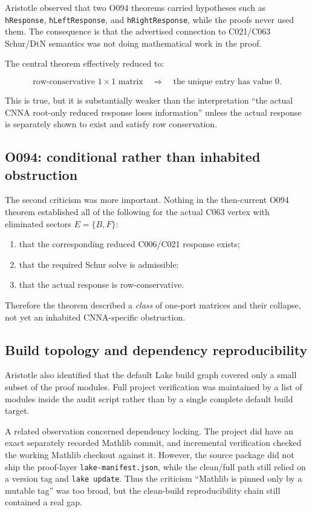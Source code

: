 \documentclass[11pt,a4paper]{article}
\begin{document}
Aristotle observed that two O094 theorems carried hypotheses such as
\texttt{hResponse}, \texttt{hLeftResponse}, and \texttt{hRightResponse}, while the proofs never used them. The consequence is that the advertised connection to C021/C063 Schur/DtN semantics was not doing mathematical work in the proof.

The central theorem effectively reduced to:

\[
\text{row-conservative } 1\times 1 \text{ matrix}
\quad\Longrightarrow\quad
\text{the unique entry has value } 0.
\]

This is true, but it is substantially weaker than the interpretation ``the actual CNNA root-only reduced response loses information'' unless the actual response is separately shown to exist and satisfy row conservation.

\subsection{O094: conditional rather than inhabited obstruction}

The second criticism was more important. Nothing in the then-current O094 theorem established all of the following for the actual C063 vertex with eliminated sectors $E=\{B,F\}$:

\begin{enumerate}
  \item that the corresponding reduced C006/C021 response exists;
  \item that the required Schur solve is admissible;
  \item that the actual response is row-conservative.
\end{enumerate}

Therefore the theorem described a \emph{class} of one-port matrices and their collapse, not yet an inhabited CNNA-specific obstruction.

\subsection{Build topology and dependency reproducibility}

Aristotle also identified that the default Lake build graph covered only a small subset of the proof modules. Full project verification was maintained by a list of modules inside the audit script rather than by a single complete default build target.

A related observation concerned dependency locking. The project did have an exact separately recorded Mathlib commit, and incremental verification checked the working Mathlib checkout against it. However, the source package did not ship the proof-layer \texttt{lake-manifest.json}, while the clean/full path still relied on a version tag and \texttt{lake update}. Thus the criticism ``Mathlib is pinned only by a mutable tag'' was too broad, but the clean-build reproducibility chain still contained a real gap.
\end{document}
